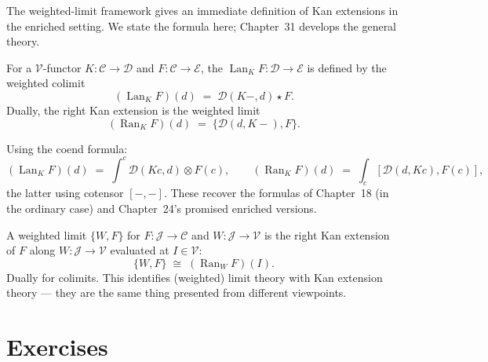 The weighted-limit framework gives an immediate definition of Kan extensions
in the enriched setting. We state the formula here; Chapter~31 develops the
general theory.

\begin{definition}
\label{def:wkan}
For a $\mathcal{V}$-functor $K : \mathcal{C} \to \mathcal{D}$ and $F :
\mathcal{C} \to \mathcal{E}$, the 
$\operatorname{Lan}_K F : \mathcal{D} \to \mathcal{E}$ is defined by the
weighted colimit
\begin{equation*}
  (\operatorname{Lan}_K F)(d) \;=\; \mathcal{D}(K-, d) \star F.
\end{equation*}
Dually, the right Kan extension is the weighted limit
\begin{equation*}
  (\operatorname{Ran}_K F)(d) \;=\; \{\mathcal{D}(d, K-), F\}.
\end{equation*}
\end{definition}

\begin{remark}
Using the coend formula:
\begin{equation*}
  (\operatorname{Lan}_K F)(d) \;=\; \int^c \mathcal{D}(K c, d) \otimes F(c),
  \qquad
  (\operatorname{Ran}_K F)(d) \;=\; \int_c [\mathcal{D}(d, K c), F(c)],
\end{equation*}
the latter using cotensor $[-,-]$. These recover the formulas of Chapter~18
(in the ordinary case) and Chapter~24's promised enriched versions.
\end{remark}

\begin{remark}
A weighted limit $\{W, F\}$ for $F : \mathcal{J} \to \mathcal{C}$ and $W :
\mathcal{J} \to \mathcal{V}$ is the right Kan extension of $F$ along
$W : \mathcal{J} \to \mathcal{V}$ evaluated at $I \in \mathcal{V}$:
\begin{equation*}
  \{W, F\} \;\cong\; (\operatorname{Ran}_W F)(I).
\end{equation*}
Dually for colimits. This identifies (weighted) limit theory with Kan
extension theory — they are the same thing presented from different
viewpoints.
\end{remark}


\section{Exercises}
\label{sec:wlim-exercises}

